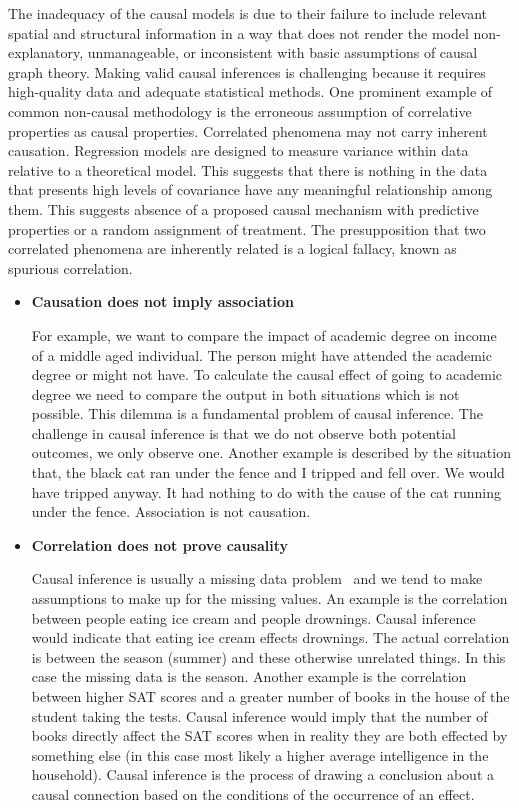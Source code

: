 \documentclass[%
 aps,
 jmp,%
 amsmath,amssymb,
 reprint,%
]{revtex4-2}
\begin{document}
The inadequacy of the causal models is due to their failure to include relevant spatial and structural information in a way that does not render the model non-explanatory, unmanageable, or inconsistent with basic assumptions of causal graph theory. 
Making valid causal inferences is challenging because it requires high-quality data and adequate statistical methods. 
One prominent example of common non-causal methodology is the erroneous assumption of correlative properties as causal properties. 
Correlated phenomena may not carry inherent causation. 
Regression models are designed to measure variance within data relative to a theoretical model. 
This suggests that there is nothing in the data that presents high levels of covariance have any meaningful relationship among them. 
This suggests absence of a proposed causal mechanism with predictive properties or a random assignment of treatment. 
The presupposition that two correlated phenomena are inherently related is a logical fallacy, known as spurious correlation.

\begin{itemize} %
	
	\item \textbf{Causation does not imply association}
	
	For example, we want to compare the impact of academic degree on income of a middle aged individual. 
	The person might have attended the academic degree or might not have. 
	To calculate the causal effect of going to academic degree we need to compare the output in both situations which is not possible. 
	This dilemma is a fundamental problem of causal inference. 
	The challenge in causal inference is that we do not observe both potential outcomes, we only observe one.
	Another example is described by the situation that, the black cat ran under the fence and I tripped and fell over. 
	We would have tripped anyway. 
	It had nothing to do with the cause of the cat running under the fence.
	Association is not causation.
	
	\item \textbf{Correlation does not prove causality}
	
	Causal inference is usually a missing data problem~\cite{guo2020survey} and we tend to make assumptions to make up for the missing values. 
	An example is the correlation between people eating ice cream and people drownings. 
	Causal inference would indicate that eating ice cream effects drownings. 
	The actual correlation is between the season (summer) and these otherwise unrelated things. 
	In this case the missing data is the season. 
	Another example is the correlation between higher SAT scores and a greater number of books in the house of the student taking the tests. 
	Causal inference would imply that the number of books directly affect the SAT scores when in reality they are both effected by something else (in this case most likely a higher average intelligence in the household). 
	Causal inference is the process of drawing a conclusion about a causal connection based on the conditions of the occurrence of an effect.
	
\end{itemize}
\end{document}
